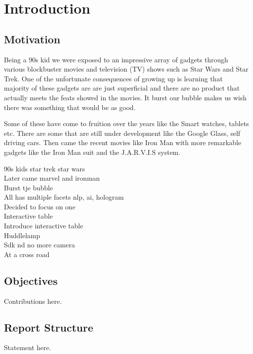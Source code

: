 
\chapter{Introduction}

\section{Motivation}
Being a 90s kid we were exposed to an impressive array of gadgets through various blockbuster movies and television (TV) shows such as Star Wars and Star Trek. One of the unfortunate consequences of growing up is learning that majority of these gadgets are are just superficial and there are no product that actually meets the feats showed in the movies. It burst our bubble makes us wish there was something that would be as good. 

Some of these have come to fruition over the years like the Smart watches, tablets etc. There are some that are still under development like the Google Glass, self driving cars. Then came the recent movies like Iron Man with more remarkable gadgets like the Iron Man suit and the J.A.R.V.I.S system. 

90s kids star trek star wars \\
Later came marvel and ironman\\
Burst tje bubble\\
All has multiple facets nlp, ai, hologram\\
Decided to focus on one\\
Interactive table\\
Introduce interactive table\\
Huddlelamp\\
Sdk nd no more camera\\
At a cross road\\




\section{Objectives}

Contributions here.


\section{Report Structure}

Statement here.

